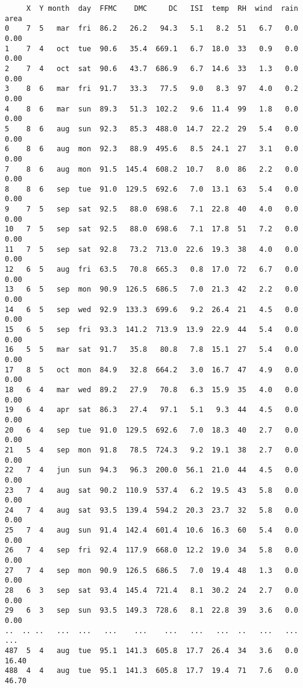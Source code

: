 \documentclass[10pt,landscape]{article}
\begin{document}
    
    \begin{verbatim}
     X  Y month  day  FFMC    DMC     DC   ISI  temp  RH  wind  rain   area
0    7  5   mar  fri  86.2   26.2   94.3   5.1   8.2  51   6.7   0.0   0.00
1    7  4   oct  tue  90.6   35.4  669.1   6.7  18.0  33   0.9   0.0   0.00
2    7  4   oct  sat  90.6   43.7  686.9   6.7  14.6  33   1.3   0.0   0.00
3    8  6   mar  fri  91.7   33.3   77.5   9.0   8.3  97   4.0   0.2   0.00
4    8  6   mar  sun  89.3   51.3  102.2   9.6  11.4  99   1.8   0.0   0.00
5    8  6   aug  sun  92.3   85.3  488.0  14.7  22.2  29   5.4   0.0   0.00
6    8  6   aug  mon  92.3   88.9  495.6   8.5  24.1  27   3.1   0.0   0.00
7    8  6   aug  mon  91.5  145.4  608.2  10.7   8.0  86   2.2   0.0   0.00
8    8  6   sep  tue  91.0  129.5  692.6   7.0  13.1  63   5.4   0.0   0.00
9    7  5   sep  sat  92.5   88.0  698.6   7.1  22.8  40   4.0   0.0   0.00
10   7  5   sep  sat  92.5   88.0  698.6   7.1  17.8  51   7.2   0.0   0.00
11   7  5   sep  sat  92.8   73.2  713.0  22.6  19.3  38   4.0   0.0   0.00
12   6  5   aug  fri  63.5   70.8  665.3   0.8  17.0  72   6.7   0.0   0.00
13   6  5   sep  mon  90.9  126.5  686.5   7.0  21.3  42   2.2   0.0   0.00
14   6  5   sep  wed  92.9  133.3  699.6   9.2  26.4  21   4.5   0.0   0.00
15   6  5   sep  fri  93.3  141.2  713.9  13.9  22.9  44   5.4   0.0   0.00
16   5  5   mar  sat  91.7   35.8   80.8   7.8  15.1  27   5.4   0.0   0.00
17   8  5   oct  mon  84.9   32.8  664.2   3.0  16.7  47   4.9   0.0   0.00
18   6  4   mar  wed  89.2   27.9   70.8   6.3  15.9  35   4.0   0.0   0.00
19   6  4   apr  sat  86.3   27.4   97.1   5.1   9.3  44   4.5   0.0   0.00
20   6  4   sep  tue  91.0  129.5  692.6   7.0  18.3  40   2.7   0.0   0.00
21   5  4   sep  mon  91.8   78.5  724.3   9.2  19.1  38   2.7   0.0   0.00
22   7  4   jun  sun  94.3   96.3  200.0  56.1  21.0  44   4.5   0.0   0.00
23   7  4   aug  sat  90.2  110.9  537.4   6.2  19.5  43   5.8   0.0   0.00
24   7  4   aug  sat  93.5  139.4  594.2  20.3  23.7  32   5.8   0.0   0.00
25   7  4   aug  sun  91.4  142.4  601.4  10.6  16.3  60   5.4   0.0   0.00
26   7  4   sep  fri  92.4  117.9  668.0  12.2  19.0  34   5.8   0.0   0.00
27   7  4   sep  mon  90.9  126.5  686.5   7.0  19.4  48   1.3   0.0   0.00
28   6  3   sep  sat  93.4  145.4  721.4   8.1  30.2  24   2.7   0.0   0.00
29   6  3   sep  sun  93.5  149.3  728.6   8.1  22.8  39   3.6   0.0   0.00
..  .. ..   ...  ...   ...    ...    ...   ...   ...  ..   ...   ...    ...
487  5  4   aug  tue  95.1  141.3  605.8  17.7  26.4  34   3.6   0.0  16.40
488  4  4   aug  tue  95.1  141.3  605.8  17.7  19.4  71   7.6   0.0  46.70

\end{verbatim}
\end{document}
